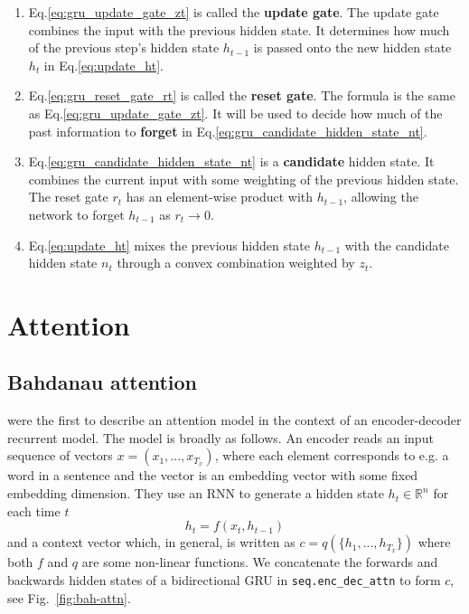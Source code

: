 \documentclass[11pt]{article}
\numberwithin{equation}{section}
\begin{document}
\begin{enumerate}[noitemsep]
\item Eq.\eqref{eq:gru_update_gate_zt} is called the \textbf{update gate}. The update gate combines the input with the previous hidden state. It determines how much of the previous step's hidden state $h_{t-1}$ is passed onto the new hidden state $h_{t}$ in Eq.\eqref{eq:update_ht}.
\item Eq.\eqref{eq:gru_reset_gate_rt} is called the \textbf{reset gate}. The formula is the same as Eq.\eqref{eq:gru_update_gate_zt}. It will be used to decide how much of the past information to \textbf{forget} in Eq.\eqref{eq:gru_candidate_hidden_state_nt}.
\item Eq.\eqref{eq:gru_candidate_hidden_state_nt} is a \textbf{candidate} hidden state. It combines the current input with some weighting of the previous hidden state. The reset gate $r_t$ has an element-wise product with $h_{t-1}$, allowing the network to forget $h_{t-1}$ as $r_t \rightarrow 0$. 
\item Eq.\eqref{eq:update_ht} mixes the previous hidden state $h_{t-1}$ with the candidate hidden state $n_t$ through a convex combination weighted by $z_t$.
\end{enumerate}

\section{Attention}
\subsection{Bahdanau attention}
\cite{bahdanau14} were the first to describe an attention model in the context of an encoder-decoder recurrent model. The model is broadly as follows. An encoder reads an input sequence of vectors $x=(x_1,...,x_{T_x})$, where each element corresponds to e.g. a word in a sentence and the vector is an embedding vector with some fixed embedding dimension. They use an RNN to generate a hidden state $h_t \in \mathbb{R}^n$ for each time $t$
\begin{equation}
h_t = f(x_t, h_{t-1})
\end{equation}
and a context vector which, in general, is written as
$c = q(\{h_1,...,h_{T_x}\})$
where both $f$ and $q$ are some non-linear functions. We concatenate the forwards and backwards hidden states of a bidirectional GRU in \verb#seq.enc_dec_attn# to form $c$, see Fig.~\ref{fig:bah-attn}.
\end{document}
